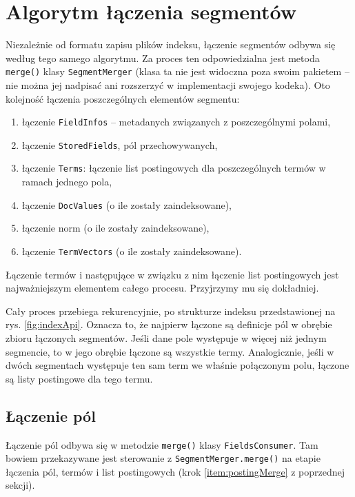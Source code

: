 \chapter{Algorytm łączenia segmentów}

Niezależnie od formatu zapisu plików indeksu, łączenie segmentów odbywa się według tego samego algorytmu. Za proces ten odpowiedzialna jest metoda \texttt{merge()} klasy \texttt{SegmentMerger} (klasa ta nie jest widoczna poza swoim pakietem -- nie można jej nadpisać ani rozszerzyć w implementacji swojego kodeka). Oto kolejność łączenia poszczególnych elementów segmentu:
\begin{enumerate}
 \item łączenie \texttt{FieldInfos} -- metadanych związanych z poszczególnymi polami,
 \item łączenie \texttt{StoredFields}, pól przechowywanych,
 \item \label{item:postingMerge} łączenie \texttt{Terms}: łączenie list postingowych dla poszczególnych termów w ramach jednego pola,
 \item łączenie \texttt{DocValues} (o ile zostały zaindeksowane),
 \item łączenie norm (o ile zostały zaindeksowane),
 \item łączenie \texttt{TermVectors} (o ile zostały zaindeksowane).
\end{enumerate}

%
Łączenie termów i następujące w związku z nim łączenie list postingowych jest najważniejszym elementem całego procesu. Przyjrzymy mu się dokładniej.

Cały proces przebiega rekurencyjnie, po strukturze indeksu przedstawionej na rys. \ref{fig:indexApi}. Oznacza to, że najpierw łączone są definicje pól w obrębie zbioru łączonych segmentów. Jeśli dane pole występuje w więcej niż jednym segmencie, to w jego obrębie łączone są wszystkie termy. Analogicznie, jeśli w dwóch segmentach występuje ten sam term we właśnie połączonym polu, łączone są listy postingowe dla tego termu.

\section{Łączenie pól}

Łączenie pól odbywa się w metodzie \texttt{merge()} klasy \texttt{FieldsConsumer}. Tam bowiem przekazywane jest sterowanie z \texttt{SegmentMerger.merge()} na etapie łączenia pól, termów i list postingowych (krok \ref{item:postingMerge} z poprzednej sekcji). 

